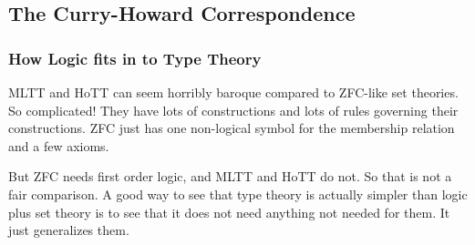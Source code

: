 \documentclass[11pt]{article}
\begin{document}
\subsection{The Curry-Howard Correspondence}
\label{sec:curry-howard}

\subsubsection{How Logic fits in to Type Theory}

MLTT and HoTT can seem horribly baroque compared to ZFC-like set theories.
So complicated!  They have lots of constructions and lots of rules
governing their constructions.  ZFC just has one non-logical symbol for the
membership relation and a few axioms.

But ZFC needs first order logic, and MLTT and HoTT do not.  So that is not
a fair comparison.  A good way to see that type theory is actually simpler
than logic plus set theory is to see that it does not need anything
not needed for them.  It just generalizes them.
\end{document}
